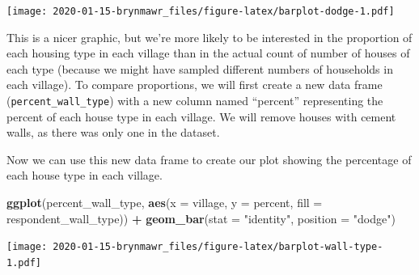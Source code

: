 \documentclass[]{book}
\newenvironment{Shaded}{\begin{snugshade}}{\end{snugshade}}
\newcommand{\KeywordTok}[1]{\textcolor[rgb]{0.13,0.29,0.53}{\textbf{#1}}}
\newcommand{\DataTypeTok}[1]{\textcolor[rgb]{0.13,0.29,0.53}{#1}}
\newcommand{\StringTok}[1]{\textcolor[rgb]{0.31,0.60,0.02}{#1}}
\newcommand{\OperatorTok}[1]{\textcolor[rgb]{0.81,0.36,0.00}{\textbf{#1}}}
\newcommand{\NormalTok}[1]{#1}
\begin{document}
\texttt{[image: 2020-01-15-brynmawr\_files/figure-latex/barplot-dodge-1.pdf]}

This is a nicer graphic, but we're more likely to be interested in the
proportion of each housing type in each village than in the actual count
of number of houses of each type (because we might have sampled
different numbers of households in each village). To compare
proportions, we will first create a new data frame
(\texttt{percent\_wall\_type}) with a new column named ``percent''
representing the percent of each house type in each village. We will
remove houses with cement walls, as there was only one in the dataset.

\begin{Shaded}
\end{Shaded}

Now we can use this new data frame to create our plot showing the
percentage of each house type in each village.

\begin{Shaded}
\begin{Highlighting}[]
 \KeywordTok{ggplot}\NormalTok{(percent_wall_type, }\KeywordTok{aes}\NormalTok{(}\DataTypeTok{x =}\NormalTok{ village, }\DataTypeTok{y =}\NormalTok{ percent, }\DataTypeTok{fill =}\NormalTok{ respondent_wall_type)) }\OperatorTok{+}
\StringTok{     }\KeywordTok{geom_bar}\NormalTok{(}\DataTypeTok{stat =} \StringTok{"identity"}\NormalTok{, }\DataTypeTok{position =} \StringTok{"dodge"}\NormalTok{)}
\end{Highlighting}
\end{Shaded}

\texttt{[image: 2020-01-15-brynmawr\_files/figure-latex/barplot-wall-type-1.pdf]}
\end{document}
